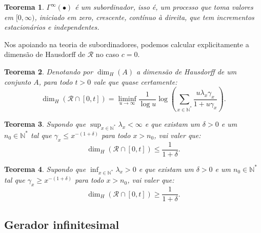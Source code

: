\documentclass[xcolor=pdftex,dvipsnames]{beamer}
\newcommand{\RR}{{\mathcal{R}}}
\newcommand{\Nz}{{\mathbb{N^*}}}
\newtheorem{teorema}{Teorema}
\begin{document}
\begin{frame}

  \begin{teorema}
    $\Gamma^\infty(\bullet)$ é um subordinador, isso é, um processo
    que toma valores em $[0, \infty)$, iniciado em zero, crescente,
    contínuo à direita, que tem incrementos estacionários e
    independentes.
  \end{teorema}
  \pause
  Nos apoiando na teoria de subordinadores, podemos calcular
  explicitamente a dimensão de Hausdorff de $\RR$ no caso $c=0$.
  \begin{teorema}
    Denotando por $\dim_H (A)$ a dimensão de Hausdorff de um conjunto
    $A$, para todo $t > 0$ vale que quase certamente:
    \begin{displaymath}
      \dim_H(\RR \cap [0, t]) = 
      \liminf_{u \to \infty} 
      \frac{1}{\log u} \log \left(
        \sum_{x \in \Nz} \frac{u \lambda_x \gamma_x}{1 + u\gamma_x}
      \right).
    \end{displaymath}
  \end{teorema}
\end{frame}

\begin{frame}

  \begin{teorema}
    Supondo que $\sup_{x\in\Nz}\lambda_x < \infty$ e que existam um
    $\delta>0$ e um $n_0 \in \Nz$ tal que $\gamma_x \leq
    x^{-(1+\delta)}$ para todo $x > n_0$, vai valer que:
    \begin{displaymath}
      \dim_H(\RR \cap [0, t]) \leq \frac{1}{1+\delta} .
    \end{displaymath}
  \end{teorema}

  \begin{teorema}
    Supondo que $\inf_{x\in\Nz}\lambda_x > 0$ e que existam um
    $\delta>0$ e um $n_0 \in \Nz$ tal que $\gamma_x \geq
    x^{-(1+\delta)}$ para todo $x > n_0$, vai valer que:
    \begin{displaymath}
      \dim_H(\RR \cap [0, t]) \geq \frac{1}{1+\delta} .
    \end{displaymath}
  \end{teorema}
\end{frame}

\subsection{Gerador infinitesimal}
\end{document}
